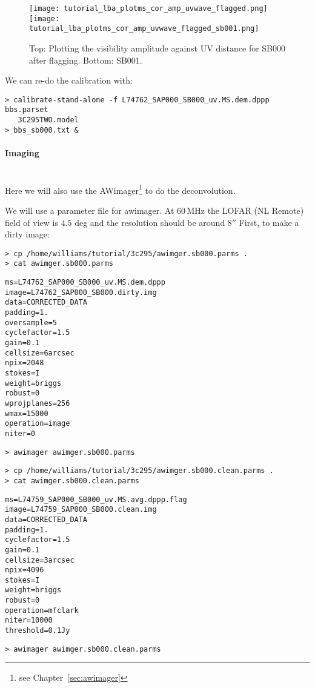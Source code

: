 \begin{figure}[htp]
 \centering
\texttt{[image: tutorial\_lba\_plotms\_cor\_amp\_uvwave\_flagged.png]}\\
\texttt{[image: tutorial\_lba\_plotms\_cor\_amp\_uvwave\_flagged\_sb001.png]}
\caption{Top: Plotting the visibility amplitude against UV distance for SB000 after flagging. Bottom: SB001.}
\label{fig:corrected_plotms_lba_raw_flagged}
\end{figure}

We can re-do the calibration with:
\begin{verbatim}
> calibrate-stand-alone -f L74762_SAP000_SB000_uv.MS.dem.dppp bbs.parset 
   3C295TWO.model 
> bbs_sb000.txt &
\end{verbatim}




\paragraph{Imaging}\mbox{}\\

Here we will also use the AWimager\footnote{see Chapter~\ref{sec:awimager}} to do the deconvolution. 

We will use a parameter file for awimager. At 60\,MHz the LOFAR (NL Remote) field of view is $4.5$ deg and the resolution should be around $8''$ First, to make a dirty image:
\begin{verbatim}
> cp /home/williams/tutorial/3c295/awimger.sb000.parms .
> cat awimger.sb000.parms 
\end{verbatim}
\begin{lstlisting}
ms=L74762_SAP000_SB000_uv.MS.dem.dppp
image=L74762_SAP000_SB000.dirty.img
data=CORRECTED_DATA
padding=1.
oversample=5
cyclefactor=1.5
gain=0.1
cellsize=6arcsec
npix=2048
stokes=I
weight=briggs
robust=0
wprojplanes=256
wmax=15000 
operation=image
niter=0
\end{lstlisting}
\begin{verbatim}
> awimager awimger.sb000.parms
\end{verbatim}

\begin{verbatim}
> cp /home/williams/tutorial/3c295/awimger.sb000.clean.parms .
> cat awimger.sb000.clean.parms 
\end{verbatim}
\begin{lstlisting}
ms=L74759_SAP000_SB000_uv.MS.avg.dppp.flag
image=L74759_SAP000_SB000.clean.img
data=CORRECTED_DATA
padding=1.
cyclefactor=1.5
gain=0.1
cellsize=3arcsec
npix=4096
stokes=I
weight=briggs
robust=0
operation=mfclark
niter=10000
threshold=0.1Jy
\end{lstlisting}
\begin{verbatim}
> awimager awimger.sb000.clean.parms
\end{verbatim}

